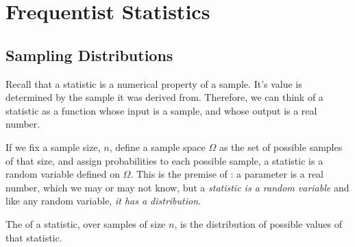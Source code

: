 \pagestyle{headings}
\chapter{Frequentist Statistics} \label{chp 5}

\section{Sampling Distributions}

Recall that a statistic is a numerical property of a sample. It's value is determined by the sample it was derived from. Therefore, we can think of a statistic as a function whose input is a sample, and whose output is a real number.

If we fix a sample size, $n$, define a sample space $\Omega$ as the set of possible samples of that size, and assign probabilities to each possible sample, a statistic is a random variable defined on $\Omega$. This is the premise of : a parameter is a real number, which we may or may not know, but a \emph{statistic is a random variable} and like any random variable, \emph{it has a distribution}.

\begin{definition}
The  of a statistic, over samples of size $n$, is the distribution of possible values of that statistic.
\end{definition}

